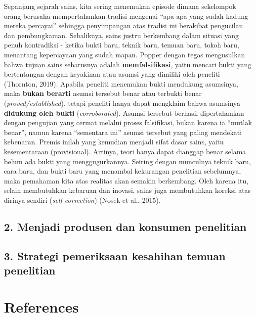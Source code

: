 \documentclass[
  english,
  man]{apa6}
\begin{document}
Sepanjang sejarah sains, kita sering menemukan episode dimana sekelompok orang berusaha mempertahankan tradisi mengenai \enquote{apa-apa yang sudah kadung mereka percayai} sehingga penyimpangan atas tradisi ini berakibat pengucilan dan pembungkaman. Sebaliknya, sains justru berkembang dalam situasi yang penuh kontradiksi - ketika bukti baru, teknik baru, temuan baru, tokoh baru, menantang kepercayaan yang sudah mapan. Popper dengan tegas mengusulkan bahwa tujuan sains seharusnya adalah \textbf{memfalsifikasi}, yaitu mencari bukti yang bertentangan dengan keyakinan atau asumsi yang dimiliki oleh peneliti (Thornton, 2019). Apabila peneliti menemukan bukti mendukung asumsinya, maka \textbf{bukan berarti} asumsi tersebut benar atau terbukti benar (\emph{proved/established}), tetapi peneliti hanya dapat mengklaim bahwa asumsinya \textbf{didukung oleh bukti} (\emph{corroborated}). Asumsi tersebut berhasil dipertahankan dengan pengujian yang cermat melalui proses falsifikasi, bukan karena ia \enquote{mutlak benar}, namun karena \enquote{sementara ini} asumsi tersebut yang paling mendekati kebenaran. Premis inilah yang kemudian menjadi sifat dasar sains, yaitu kesementaraan (provisional). Artinya, teori hanya dapat dianggap benar selama belum ada bukti yang menggugurkannya. Seiring dengan munculnya teknik baru, cara baru, dan bukti baru yang menambal kekurangan penelitian sebelumnya, maka pemahaman kita atas realitas akan semakin berkembang. Oleh karena itu, selain membutuhkan kebaruan dan inovasi, sains juga membutuhkan koreksi atas dirinya sendiri (\emph{self-correction}) (Nosek et al., 2015).

\hypertarget{menjadi-produsen-dan-konsumen-penelitian}{%
\subsection{2. Menjadi produsen dan konsumen penelitian}\label{menjadi-produsen-dan-konsumen-penelitian}}

\hypertarget{strategi-pemeriksaan-kesahihan-temuan-penelitian}{%
\subsection{3. Strategi pemeriksaan kesahihan temuan penelitian}\label{strategi-pemeriksaan-kesahihan-temuan-penelitian}}

\newpage

\hypertarget{references}{%
\section{References}\label{references}}
\end{document}
